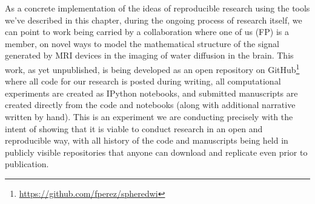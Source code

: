 \documentclass[ChapterTOCs,krantz2]{krantz} %
\theoremstyle{definition}
\begin{document}
As a concrete implementation of the ideas of reproducible research using the
tools we've described in this chapter, during the ongoing process of research
itself, we can point to work being carried by a collaboration where one of us
(FP) is a member, on novel ways to model the mathematical structure of the
signal generated by MRI devices in the imaging of water diffusion in the
brain.  This work, as yet unpublished, is being developed as an open repository
on GitHub\footnote{\url{https://github.com/fperez/spheredwi}} where all code
for our research is posted during writing, all computational experiments are
created as IPython notebooks, and submitted manuscripts are created directly
from the code and notebooks (along with additional narrative written by hand).
This is an experiment we are conducting precisely with the intent of showing
that it is viable to conduct research in an open and reproducible way, with all
history of the code and manuscripts being held in publicly visible repositories
that anyone can download and replicate even prior to publication. 
\end{document}
